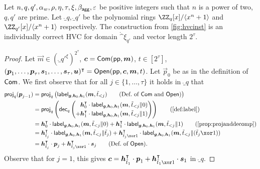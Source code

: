 \begin{lemma}\label{lem:veccomcorrectness}
  Let $n,q,q',\alpha_w,\rho,\eta,\tau,\xi,\beta_{\mathsf{agg}},\varepsilon$ be positive integers such that $n$ is a power of two, $q,q'$ are prime.
  Let $\ring_q,\ring_{q'}$ be the polynomial rings $\ZZ_q[x]/\langle x^n+1\rangle$ and $\ZZ_{q'}[x]/\langle x^n+1\rangle$ respectively.
  The construction from \autoref{fig:hvcinst} is an individually correct HVC for domain $\ring^\xi_{q'}$ and vector length $2^\tau$.
\end{lemma}
\begin{proof}
Let $\vec{m} \in (\ring_{q'}^{\xi})^{2^\tau}$, $\boldsymbol{c} = \mathsf{Com}(\mathsf{pp},\boldsymbol{m})$, $t\in[2^\tau]$, $(\boldsymbol{p}_1,\dots,\boldsymbol{p}_{\tau},\boldsymbol{s}_1, \dots, \boldsymbol{s}_{\tau},\boldsymbol{u})^\intercal = \mathsf{Open}(\mathsf{pp},\boldsymbol{c},\boldsymbol{m},t)$. Let $\vec{p}_{0}$ be as in the definition of $\mathsf{Com}$.
We first observe that for all $j\in\{1,\ldots,\tau\}$ it holds in $\ring_q$ that
\begin{align*}
  \projmod{q}(\vec{p}_{j-1})
  ={}&\projmod{q}\left(\lbl_{\vec{g},\vec{h}_0,\vec{h}_1}(\vec{m},\tilde t_{< j})\tag{Def.\ of $\commit$ and $\open$}\right)\\
  ={}&\projmod{q}\left(\decompmod{q}\left(
      \begin{aligned}
        &\vec{h}_0^\transpose \cdot\lbl_{\vec{g},\vec{h}_0,\vec{h}_1}(\vec{m},\tilde t_{< j}\Vert 0)\\
        +& \vec{h}_1^\transpose \cdot\lbl_{\vec{g},\vec{h}_0,\vec{h}_1}(\vec{m},\tilde t_{< j}\Vert 1)
      \end{aligned}
    \right)\right)\tag{\autoref{def:label}}\\
  ={}&\vec{h}_0^\transpose \cdot\lbl_{\vec{g},\vec{h}_0,\vec{h}_1}(\vec{m},\tilde t_{< j}\Vert 0) + \vec{h}_1^\transpose \cdot\lbl_{\vec{g},\vec{h}_0,\vec{h}_1}(\vec{m},\tilde t_{< j}\Vert 1)\tag{\autoref{prop:projanddecomp}}\\
  ={}&\vec{h}_{\tilde t_{j}}^\transpose \cdot\lbl_{\vec{g},\vec{h}_0,\vec{h}_1}(\vec{m},\tilde t_{< j}\Vert \tilde t_{j}) + \vec{h}_{\tilde t_{j}\xor 1}^\transpose \cdot\lbl_{\vec{g},\vec{h}_0,\vec{h}_1}(\vec{m},\tilde t_{< j}\Vert (\tilde t_{j}\xor 1))\\
  ={}&\vec{h}_{\tilde t_{j}}^\transpose \cdot\vec{p}_{j} + \vec{h}_{\tilde t_{j}\xor 1}^\transpose \cdot\vec{s}_{j}\tag{Def.\ of $\open$}.
\end{align*}
Observe that for $j=1$, this gives $\vec{c} = \vec{h}_{\tilde t_1}^\transpose\cdot \vec{p}_{1} + \vec{h}_{\tilde t_1 \xor 1}^\transpose \cdot \vec{s}_{1}$ in $\ring_q$.

\end{proof}

